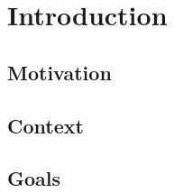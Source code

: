 
\chapter{Introduction}
\label{ch:introduction}

\section{Motivation}
\label{sec:introduction:motivation}

\kant[3-5]

\section{Context}
\label{sec:introduction:context}

\kant[6-8]

\section{Goals}
\label{sec:introduction:goals}

\kant[9-11]


